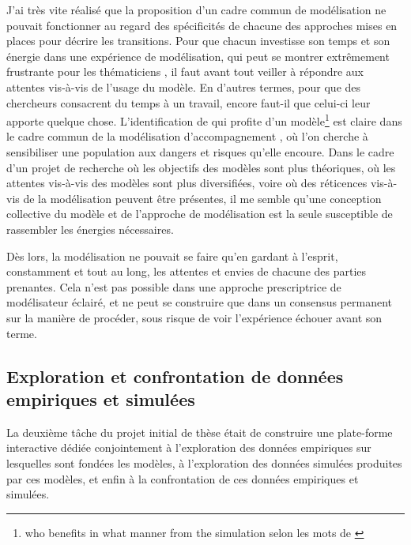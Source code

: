 J'ai très vite réalisé que la proposition d'un cadre commun de modélisation ne pouvait fonctionner au regard des spécificités de chacune des approches mises en places pour décrire les transitions.
Pour que chacun investisse son temps et son énergie dans une expérience de modélisation, qui peut se montrer extrêmement frustrante pour les thématiciens \autocite[470]{ouriachi_lelaboration_2017}, il faut avant tout veiller à répondre aux attentes vis-à-vis de l'usage du modèle.
En d'autres termes, pour que des chercheurs consacrent du temps à un travail, encore faut-il que celui-ci leur apporte quelque chose.
L'identification de qui \og profite\fg{} d'un modèle\footnote{
\og who benefits in what manner from the simulation\fg{} selon les mots de \textcite[260]{lake_trends_2014}
} est claire dans le cadre commun de la modélisation d'accompagnement \autocite[voir][par exemple]{etienne_modelisation_2015}, où l'on cherche à sensibiliser une population aux dangers et risques qu'elle encoure.
Dans le cadre d'un projet de recherche où les objectifs des modèles sont plus théoriques, où les attentes vis-à-vis des modèles sont plus diversifiées, voire où des réticences vis-à-vis de la modélisation peuvent être présentes, il me semble qu'une conception collective du modèle et de l'approche de modélisation est la seule susceptible de rassembler les énergies nécessaires.

Dès lors, la modélisation ne pouvait se faire qu'en gardant à l'esprit, constamment et tout au long, les attentes et envies de chacune des parties prenantes.
Cela n'est pas possible dans une approche prescriptrice de \og modélisateur éclairé\fg{}, et ne peut se construire que dans un consensus permanent sur la manière de procéder, sous risque de voir l'expérience échouer avant son terme.

\subsection{Exploration et confrontation de données empiriques et simulées}

La deuxième tâche du projet initial de thèse était de construire une plate-forme interactive dédiée conjointement à l'exploration des données empiriques sur lesquelles sont fondées les modèles, à l'exploration des données simulées produites par ces modèles, et enfin à la confrontation de ces données empiriques et simulées.

